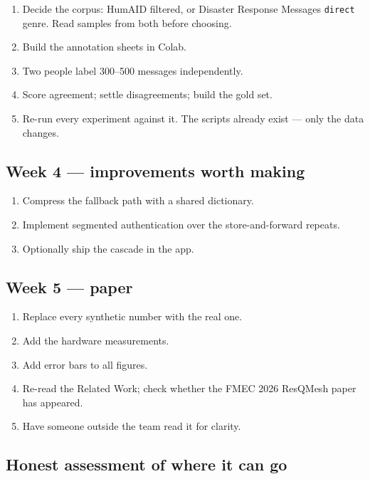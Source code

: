 \documentclass[11pt,a4paper]{article}
\begin{document}
\begin{enumerate}
\item Decide the corpus: HumAID filtered, or Disaster Response Messages
      \texttt{direct} genre. Read samples from both before choosing.
\item Build the annotation sheets in Colab.
\item Two people label 300--500 messages independently.
\item Score agreement; settle disagreements; build the gold set.
\item Re-run every experiment against it. The scripts already exist --- only
      the data changes.
\end{enumerate}

\subsection{Week 4 --- improvements worth making}

\begin{enumerate}
\item Compress the fallback path with a shared dictionary.
\item Implement segmented authentication over the store-and-forward repeats.
\item Optionally ship the cascade in the app.
\end{enumerate}

\subsection{Week 5 --- paper}

\begin{enumerate}
\item Replace every synthetic number with the real one.
\item Add the hardware measurements.
\item Add error bars to all figures.
\item Re-read the Related Work; check whether the FMEC 2026 ResQMesh paper has
      appeared.
\item Have someone outside the team read it for clarity.
\end{enumerate}

\subsection{Honest assessment of where it can go}
\end{document}
